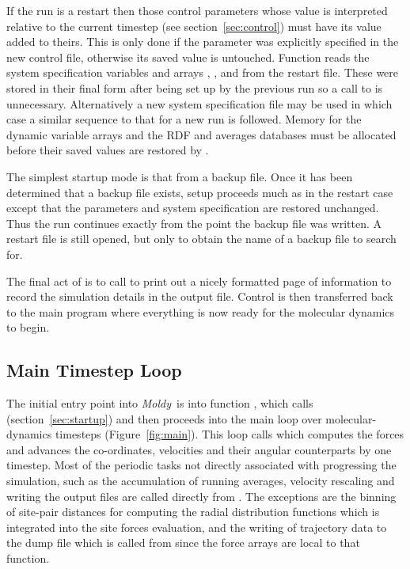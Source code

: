 \documentclass[a4paper,twoside]{report}
\newcommand{\moldy}{\emph{Moldy}}
\begin{document}
If the run is a restart then those control parameters whose value is
interpreted relative to the current timestep (see
section~\ref{sec:control}) must have its value added to theirs.  This
is only done if the parameter was explicitly specified in the new
control file, otherwise its saved value is untouched.  Function
 reads the system specification variables and
arrays , ,  and
 from the restart file.  These were stored in their
final form after being set up by the previous run so a call to
 is unnecessary.  Alternatively a new system
specification file may be used in which case a similar sequence to
that for a new run is followed.  Memory for the dynamic variable
arrays and the RDF and averages databases must be allocated before
their saved values are restored by .

The simplest startup mode is that from a backup file.  Once it has
been determined that a backup file exists, setup proceeds much as in
the restart case except that the parameters and system specification
are restored unchanged.  Thus the run continues exactly from the
point the backup file was written. A restart file is still opened, but
only to obtain the name of a backup file to search for.

The final act of  is to call 
to print out a nicely formatted page of information to record the
simulation details in the output file.  Control is then transferred
back to the main program where everything is now ready for the
molecular dynamics to begin.


\subsection{Main Timestep Loop}

The initial entry point into \moldy\ is into function ,
which calls  (section~\ref{sec:startup}) and then
proceeds into the main loop over molecular-dynamics timesteps
(Figure~\ref{fig:main}).  This loop calls  which
computes the forces and advances the co-ordinates, velocities and
their angular counterparts by one timestep.  Most of the periodic
tasks not directly associated with progressing the simulation, such as
the accumulation of running averages, velocity rescaling and writing
the output files are called directly from .
The exceptions are the binning of site-pair distances for computing
the radial distribution functions which is integrated into the site
forces evaluation, and the writing of trajectory data to the dump file
which is called from  since the force arrays are
local to that function.
\end{document}
